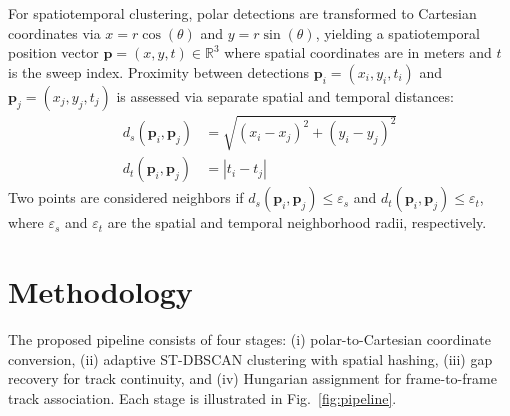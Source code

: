 \documentclass[conf]{new-aiaa}
\begin{document}
For spatiotemporal clustering, polar detections are transformed to Cartesian coordinates via $x = r \cos(\theta)$ and $y = r \sin(\theta)$, yielding a spatiotemporal position vector $\mathbf{p} = (x, y, t) \in \mathbb{R}^3$ where spatial coordinates are in meters and $t$ is the sweep index. Proximity between detections $\mathbf{p}_i = (x_i, y_i, t_i)$ and $\mathbf{p}_j = (x_j, y_j, t_j)$ is assessed via separate spatial and temporal distances:
\begin{align}
    d_s(\mathbf{p}_i, \mathbf{p}_j) &= \sqrt{(x_i - x_j)^2 + (y_i - y_j)^2} \\
    d_t(\mathbf{p}_i, \mathbf{p}_j) &= |t_i - t_j|
\end{align}
Two points are considered neighbors if $d_s(\mathbf{p}_i, \mathbf{p}_j) \leq \varepsilon_s$ and $d_t(\mathbf{p}_i, \mathbf{p}_j) \leq \varepsilon_t$, where $\varepsilon_s$ and $\varepsilon_t$ are the spatial and temporal neighborhood radii, respectively.

\section{Methodology}

The proposed pipeline consists of four stages: (i) polar-to-Cartesian coordinate conversion, (ii) adaptive ST-DBSCAN clustering with spatial hashing, (iii) gap recovery for track continuity, and (iv) Hungarian assignment for frame-to-frame track association. Each stage is illustrated in Fig.~\ref{fig:pipeline}.
\end{document}
